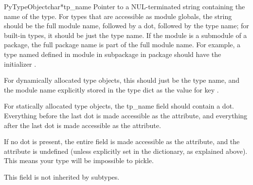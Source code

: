 \begin{cmemberdesc}{PyTypeObject}{char*}{tp_name}
  Pointer to a NUL-terminated string containing the name of the type.
  For types that are accessible as module globals, the string should
  be the full module name, followed by a dot, followed by the type
  name; for built-in types, it should be just the type name.  If the
  module is a submodule of a package, the full package name is part of
  the full module name.  For example, a type named  defined
  in module  in subpackage  in package 
  should have the  initializer .

  For dynamically allocated type objects, this should just be the type
  name, and the module name explicitly stored in the type dict as the
  value for key .

  For statically allocated type objects, the tp_name field should
  contain a dot.  Everything before the last dot is made accessible as
  the  attribute, and everything after the last dot
  is made accessible as the  attribute.

  If no dot is present, the entire  field is made
  accessible as the  attribute, and the
   attribute is undefined (unless explicitly set in
  the dictionary, as explained above).  This means your type will be
  impossible to pickle.

  This field is not inherited by subtypes.
\end{cmemberdesc}


